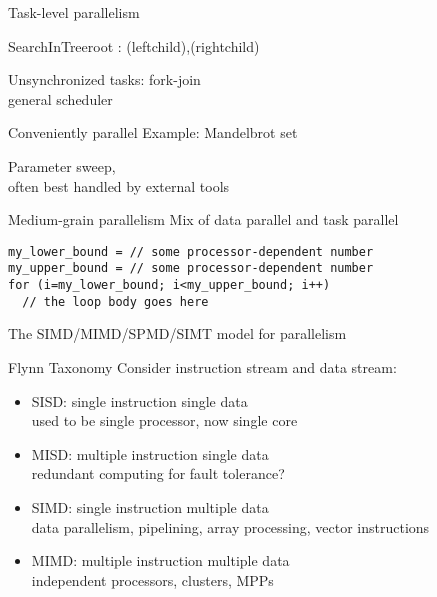 \begin{numberedframe}{Task-level parallelism}
  \begin{displayprocedure}{SearchInTree}{root}
  {\parl: \search(leftchild),\search(rightchild)}
\end{displayprocedure}

Unsynchronized tasks: fork-join\\
general scheduler

\begin{displayalgorithm}
\end{displayalgorithm}
\end{numberedframe}

\begin{numberedframe}{Conveniently parallel}
  Example: Mandelbrot set

  Parameter sweep,\\
  often best handled by external tools
\end{numberedframe}

\begin{numberedframe}{Medium-grain parallelism}
Mix of data parallel and task parallel
\begin{lstlisting}
my_lower_bound = // some processor-dependent number
my_upper_bound = // some processor-dependent number
for (i=my_lower_bound; i<my_upper_bound; i++)
  // the loop body goes here
\end{lstlisting}
\end{numberedframe}

 {The SIMD/MIMD/SPMD/SIMT model for parallelism}

\begin{numberedframe}{Flynn Taxonomy}
  Consider instruction stream and data stream:
  \begin{itemize}
  \item SISD: single instruction single data\\
    used to be single processor, now single core
  \item MISD: multiple instruction single data\\
    redundant computing for fault tolerance?
  \item SIMD: single instruction multiple data\\
    data parallelism, pipelining, array processing, vector instructions
  \item MIMD: multiple instruction multiple data\\
    independent processors, clusters, MPPs
  \end{itemize}
\end{numberedframe}

